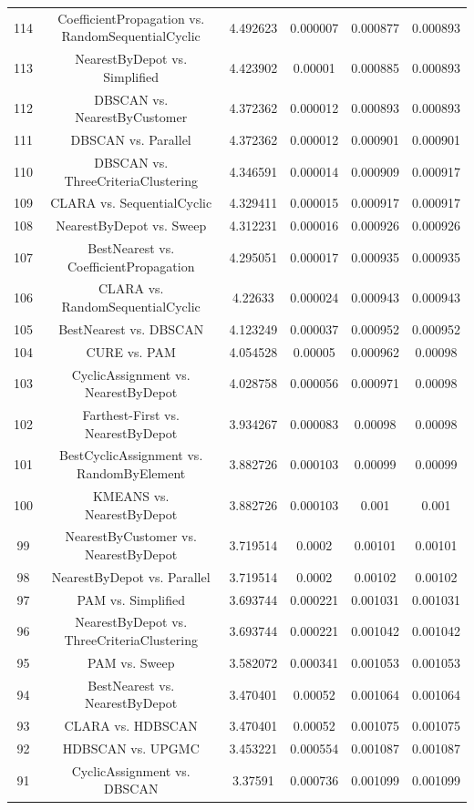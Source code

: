 \documentclass[a4paper,10pt]{article}
\begin{document}
\begin{landscape}
\begin{table}[!htp]
\begin{tabular}{cccccc}
114&CoefficientPropagation vs. RandomSequentialCyclic&4.492623&0.000007&0.000877&0.000893\\
113&NearestByDepot vs. Simplified&4.423902&0.00001&0.000885&0.000893\\
112&DBSCAN vs. NearestByCustomer&4.372362&0.000012&0.000893&0.000893\\
111&DBSCAN vs. Parallel&4.372362&0.000012&0.000901&0.000901\\
110&DBSCAN vs. ThreeCriteriaClustering&4.346591&0.000014&0.000909&0.000917\\
109&CLARA vs. SequentialCyclic&4.329411&0.000015&0.000917&0.000917\\
108&NearestByDepot vs. Sweep&4.312231&0.000016&0.000926&0.000926\\
107&BestNearest vs. CoefficientPropagation&4.295051&0.000017&0.000935&0.000935\\
106&CLARA vs. RandomSequentialCyclic&4.22633&0.000024&0.000943&0.000943\\
105&BestNearest vs. DBSCAN&4.123249&0.000037&0.000952&0.000952\\
104&CURE vs. PAM&4.054528&0.00005&0.000962&0.00098\\
103&CyclicAssignment vs. NearestByDepot&4.028758&0.000056&0.000971&0.00098\\
102&Farthest-First vs. NearestByDepot&3.934267&0.000083&0.00098&0.00098\\
101&BestCyclicAssignment vs. RandomByElement&3.882726&0.000103&0.00099&0.00099\\
100&KMEANS vs. NearestByDepot&3.882726&0.000103&0.001&0.001\\
99&NearestByCustomer vs. NearestByDepot&3.719514&0.0002&0.00101&0.00101\\
98&NearestByDepot vs. Parallel&3.719514&0.0002&0.00102&0.00102\\
97&PAM vs. Simplified&3.693744&0.000221&0.001031&0.001031\\
96&NearestByDepot vs. ThreeCriteriaClustering&3.693744&0.000221&0.001042&0.001042\\
95&PAM vs. Sweep&3.582072&0.000341&0.001053&0.001053\\
94&BestNearest vs. NearestByDepot&3.470401&0.00052&0.001064&0.001064\\
93&CLARA vs. HDBSCAN&3.470401&0.00052&0.001075&0.001075\\
92&HDBSCAN vs. UPGMC&3.453221&0.000554&0.001087&0.001087\\
91&CyclicAssignment vs. DBSCAN&3.37591&0.000736&0.001099&0.001099\\

\end{tabular}
\end{table}
\end{landscape}
\end{document}
